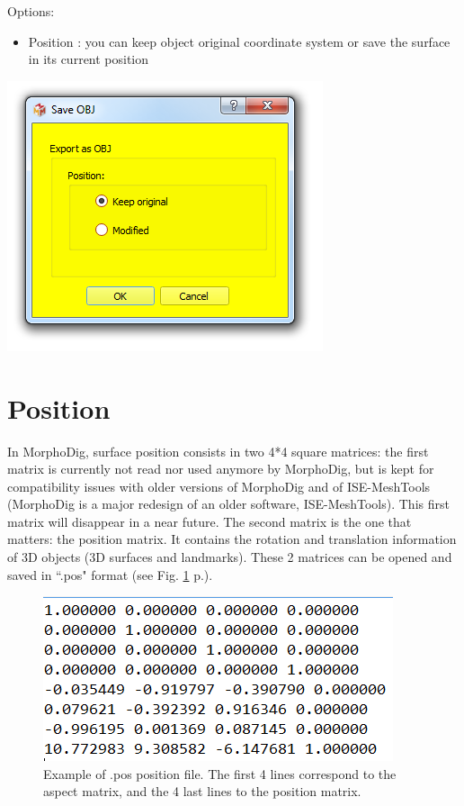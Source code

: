 \begin{minipage}{0.5\textwidth}
Options:
\begin{itemize}


\item Position : you can keep object original coordinate system or save the surface in its current position
\end{itemize}

\end{minipage}    
\begin{minipage}{0.5\textwidth}\centering
  \includegraphics[scale=0.5]{images/07/surface/save_obj.png}
 \end{minipage} 



\section{Position}
In MorphoDig, surface position consists in two
4*4 square matrices: the first matrix is currently not read nor used anymore by MorphoDig, but is kept for compatibility issues with older versions of MorphoDig and of ISE-MeshTools (MorphoDig is a major redesign of an older software, ISE-MeshTools). This first matrix will disappear in a near future.  The second matrix is the one that matters: the position matrix. It contains the rotation and translation information of 3D objects (3D surfaces and landmarks). These 2 matrices can be opened and saved in ``.pos" format (see Fig. \ref{position_file} p.\pageref{position_file}).


\begin{figure}
  \centering
  \includegraphics[scale=0.5]{images/07/position/position_file.png}
 \caption{Example of .pos position file. The first 4 lines correspond
to the aspect matrix, and the 4 last lines to the position matrix.}
\label{position_file}
\end{figure}
 



